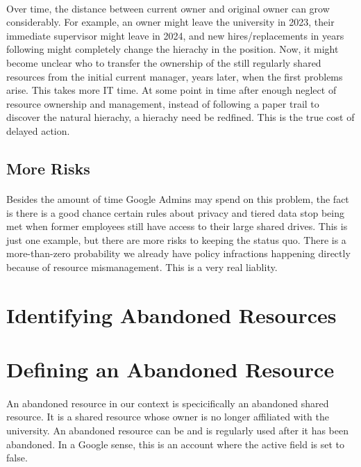 \documentclass{article}
\begin{document}
\paragraph*{} Over time, the distance between current owner and original owner can grow considerably.
For example, an owner might leave the university in 2023, their immediate supervisor might leave in 2024, and new hires/replacements in years following might completely change the hierachy in the position.
Now, it might become unclear who to transfer the ownership of the still regularly shared resources from the initial current manager, years later, when the first problems arise. This takes more IT time.
At some point in time after enough neglect of resource ownership and management, instead of following a paper trail to discover the natural hierachy, a hierachy need be redfined.
This is the true cost of delayed action.

\subsection*{More Risks}
\paragraph*{} Besides the amount of time Google Admins may spend on this problem, the fact is there is a good chance certain rules about privacy and tiered data stop being met when former employees still have access to their large shared drives.
This is just one example, but there are more risks to keeping the status quo. There is a more-than-zero probability we already have policy
infractions happening directly because of resource mismanagement. This is a very real liablity.

\newpage
\section{Identifying Abandoned Resources}
\section*{Defining an Abandoned Resource}
\paragraph*{} An abandoned resource in our context is specicifically an abandoned shared resource.
It is a shared resource whose owner is no longer affiliated with the university. An abandoned resource can be and is regularly used after it has been abandoned.
In a Google sense, this is an account where the active field is set to false.
\end{document}
